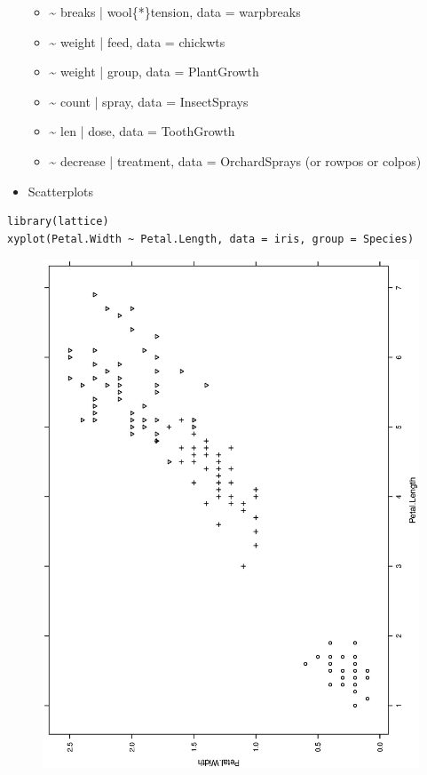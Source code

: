 \documentclass[captions=tableheading]{scrbook}
\begin{document}
\begin{itemize}
\begin{itemize}
\item \~{} breaks | wool\{*\}tension, data = warpbreaks
\item \~{} weight | feed, data = chickwts
\item \~{} weight | group, data = PlantGrowth
\item \~{} count | spray, data = InsectSprays
\item \~{} len | dose, data = ToothGrowth
\item \~{} decrease | treatment, data = OrchardSprays (or rowpos or colpos)
\end{itemize}
\item Scatterplots
\end{itemize}


\begin{verbatim}
library(lattice)
xyplot(Petal.Width ~ Petal.Length, data = iris, group = Species)
\end{verbatim}







\begin{figure}[th]
  \includegraphics[angle=270, totalheight=4in]{ps/xyplot-group.ps}
  \caption{}
  \label{fig:xyplot-group}
\end{figure}
\end{document}
